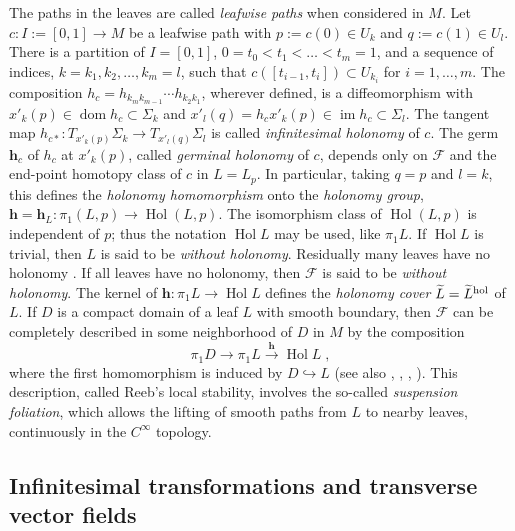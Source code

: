 \documentclass{memo-l}
\theoremstyle{plain}
\theoremstyle{definition}
\theoremstyle{remark}
\newcommand{\FF}{\mathcal{F}}
\newcommand{\bfh}{\boldsymbol{h}}
\newcommand{\im}{\operatorname{im}}
\newcommand{\Hol}{\operatorname{Hol}}
\newcommand{\dom}{\operatorname{dom}}
\numberwithin{section}{chapter}
\numberwithin{equation}{section}%
\begin{document}
The paths in the leaves are called \emph{leafwise paths} when considered in $M$. Let $c:I:=[0,1]\to M$ be a leafwise path with $p:=c(0)\in U_k$ and $q:=c(1)\in U_l$. There is a partition of $I=[0,1]$, $0=t_0<t_1<\dots<t_m=1$, and a sequence of indices, $k=k_1,k_2,\dots,k_m=l$, such that $c([t_{i-1},t_i])\subset U_{k_i}$ for $i=1,\dots,m$. The composition $h_c=h_{k_mk_{m-1}}\cdots h_{k_2k_1}$, wherever defined, is a diffeomorphism with $x'_k(p)\in\dom h_c\subset\Sigma_k$ and $x'_l(q)=h_cx'_k(p)\in\im h_c\subset\Sigma_l$. The tangent map $h_{c*}:T_{x'_k(p)}\Sigma_k\to T_{x'_l(q)}\Sigma_l$ is called \emph{infinitesimal holonomy}  of $c$. The germ $\bfh_c$ of $h_c$ at $x'_k(p)$, called \emph{germinal holonomy}  of $c$, depends only on $\FF$ and the end-point homotopy class of $c$ in $L=L_p$. In particular, taking $q=p$ and $l=k$, this defines the \emph{holonomy homomorphism} onto the \emph{holonomy group}, $\bfh=\bfh_L:\pi_1(L,p)\to\Hol(L,p)$. The isomorphism class of $\Hol(L,p)$ is independent of $p$; thus the notation $\Hol L$ may be used, like $\pi_1L$. If $\Hol L$ is trivial, then $L$ is said to be \emph{without holonomy}. Residually many leaves have no holonomy \cite{Hector1977a,EpsteinMillettTischler1977}. If all leaves have no holonomy, then $\FF$ is said to be \emph{without holonomy}. The kernel of $\bfh:\pi_1 L\to\Hol L$ defines the \emph{holonomy cover}  $\widetilde L=\widetilde L^{\text{\rm hol}}$ of $L$. If $D$ is a compact domain of a leaf $L$ with smooth boundary, then $\FF$ can be completely described in some neighborhood of $D$ in $M$ by the composition
\[
\pi_1D \to \pi_1L \xrightarrow{\bfh} \Hol L\;,
\]
where the first homomorphism is induced by $D\hookrightarrow L$ \cite[Section~2.7]{Haefliger1962} (see also \cite[Theorem~2.1.7]{HectorHirsch1981-A}, \cite[Theorem~IV.2]{CamachoLinsNeto1985}, \cite[Theorem~II.2.29]{Godbillon1991}, \cite[Theorem~2.3.9]{CandelConlon2000-I}). This description, called Reeb's local stability, involves the so-called \emph{suspension foliation}, which allows the lifting of smooth paths from $L$ to nearby leaves, continuously in the $C^\infty$ topology.



\subsection{Infinitesimal transformations and transverse vector fields}\label{ss: infinitesmal transfs}
\end{document}
